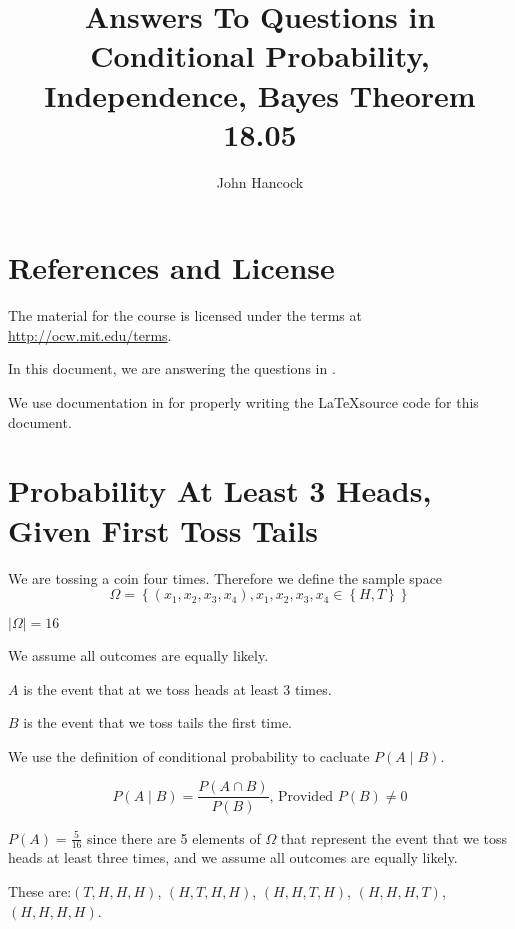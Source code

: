 \documentclass[a4paper,11pt]{article}
\author{John Hancock}
\title{Answers To Questions in Conditional Probability, Independence, 
Bayes Theorem 18.05}
\begin{document}
\maketitle
\tableofcontents
\section{References and License}
The material for the course is licensed under the terms at 
\url{http://ocw.mit.edu/terms}.

In this document, we are answering the questions in \cite{slides3}.

We use documentation in for properly writing the
\LaTeX source code for this document.
 
\label{prob1}
\section{Probability At Least 3 Heads, Given First Toss Tails}

We are tossing a coin four times. Therefore we define the sample space
\begin{equation}
  \Omega = \left\{ \left( x_{1}, x_{2}, x_{3}, x_{4} \right), 
    x_{1}, x_{2}, x_{3}, x_{4} \in \left\{H, T \right\} \right\}
\end{equation}

$ \left| \Omega \right| = 16$

We assume all outcomes are equally likely.

$A$ is the event that at we toss heads at least 3 times.

$B$ is the event that we toss tails the first time.


We use the definition of conditional probability to cacluate
$P \left( A \mid B \right)$.

\begin{equation} \label{defCondProb}
P \left( A \mid B \right) = \frac{ P \left( A \cap B \right) } 
  { P \left( B \right) } \text{, Provided  } P \left( B \right) \neq 0
\end{equation}

$P \left(A \right) = \frac{5}{16}$ since there are 5 elements of $\Omega$
that represent the event that we toss heads at least three times, and
we assume all outcomes are equally likely.

These are:$\left(T,H,H,H \right)$, $\left(H,T,H,H \right)$, 
$\left(H,H,T,H \right)$, $\left(H,H,H,T \right)$, 
$\left(H,H,H,H \right)$.
\end{document}
